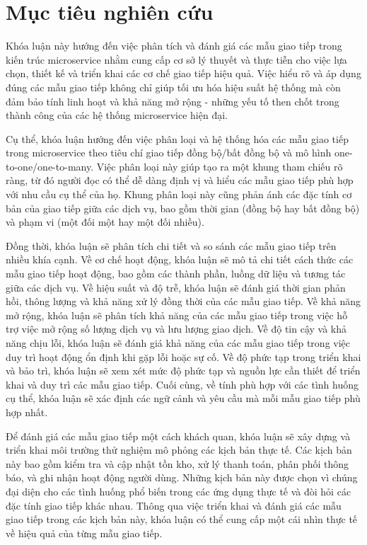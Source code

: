 \section{Mục tiêu nghiên cứu}
Khóa luận này hướng đến việc phân tích và đánh giá các mẫu giao tiếp trong kiến
trúc microservice nhằm cung cấp cơ sở lý thuyết và thực tiễn cho việc lựa chọn,
thiết kế và triển khai các cơ chế giao tiếp hiệu quả. Việc hiểu rõ và áp dụng
đúng các mẫu giao tiếp không chỉ giúp tối ưu hóa hiệu suất hệ thống mà còn đảm
bảo tính linh hoạt và khả năng mở rộng - những yếu tố then chốt trong thành
công của các hệ thống microservice hiện đại.

Cụ thể, khóa luận hướng đến việc phân loại và hệ thống hóa các mẫu giao tiếp
trong microservice theo tiêu chí giao tiếp đồng bộ/bất đồng bộ và mô hình
one-to-one/one-to-many. Việc phân loại này giúp tạo ra một khung tham chiếu rõ
ràng, từ đó người đọc có thể dễ dàng định vị và hiểu các mẫu giao tiếp phù hợp
với nhu cầu cụ thể của họ. Khung phân loại này cũng phản ánh các đặc tính cơ
bản của giao tiếp giữa các dịch vụ, bao gồm thời gian (đồng bộ hay bất đồng
bộ) và phạm vi (một đối một hay một đối nhiều).

Đồng thời, khóa luận sẽ phân tích chi tiết và so sánh các mẫu giao tiếp trên nhiều khía cạnh. Về cơ chế hoạt động, khóa luận sẽ mô tả chi tiết cách thức các mẫu giao tiếp hoạt động, bao gồm các thành phần, luồng dữ liệu và tương tác giữa các dịch vụ. Về hiệu suất và độ trễ, khóa luận sẽ đánh giá thời gian phản hồi, thông lượng và khả năng xử lý đồng thời của các mẫu giao tiếp. Về khả năng mở rộng, khóa luận sẽ phân tích khả năng của các mẫu giao tiếp trong việc hỗ trợ việc mở rộng số lượng dịch vụ và lưu lượng giao dịch. Về độ tin cậy và khả năng chịu lỗi, khóa luận sẽ đánh giá khả năng của các mẫu giao tiếp trong việc duy trì hoạt động ổn định khi gặp lỗi hoặc sự cố. Về độ phức tạp trong triển khai và bảo trì, khóa luận sẽ xem xét mức độ phức tạp và nguồn lực cần thiết để triển khai và duy trì các mẫu giao tiếp. Cuối cùng, về tính phù hợp với các tình huống cụ thể, khóa luận sẽ xác định các ngữ cảnh và yêu cầu mà mỗi mẫu giao tiếp phù hợp nhất.

Để đánh giá các mẫu giao tiếp một cách khách quan, khóa luận sẽ xây dựng và triển khai môi trường thử nghiệm mô phỏng các kịch bản thực tế. Các kịch bản này bao gồm kiểm tra và cập nhật tồn kho, xử lý thanh toán, phân phối thông báo, và ghi nhận hoạt động người dùng. Những kịch bản này được chọn vì chúng đại diện cho các tình huống phổ biến trong các ứng dụng thực tế và đòi hỏi các đặc tính giao tiếp khác nhau. Thông qua việc triển khai và đánh giá các mẫu giao tiếp trong các kịch bản này, khóa luận có thể cung cấp một cái nhìn thực tế về hiệu quả của từng mẫu giao tiếp.

